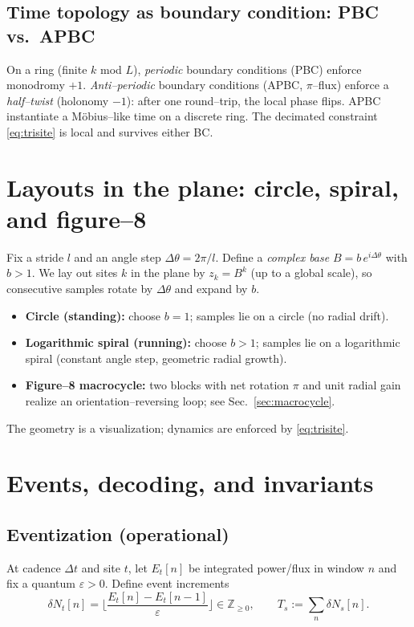 \documentclass[11pt]{article}
\theoremstyle{definition}
\theoremstyle{remark}
\newcommand{\Z}{\mathbb{Z}}
\begin{document}
\subsection{Time topology as boundary condition: PBC vs.\ APBC}
On a ring (finite $k$ mod $L$), \emph{periodic} boundary conditions (PBC) enforce monodromy $+1$.
\emph{Anti--periodic} boundary conditions (APBC, $\pi$--flux) enforce a \emph{half--twist} (holonomy $-1$): after one round--trip,
the local phase flips. APBC instantiate a Möbius--like time on a discrete ring. The decimated constraint \eqref{eq:trisite} is local
and survives either BC.

\section{Layouts in the plane: circle, spiral, and figure--8}
Fix a stride $l$ and an angle step $\Delta\theta=2\pi/l$. Define a \emph{complex base} $B=b\,e^{i\Delta\theta}$ with $b>1$.
We lay out sites $k$ in the plane by $z_k = B^{k}$ (up to a global scale), so consecutive samples rotate by $\Delta\theta$ and expand by $b$.
\begin{itemize}
\item \textbf{Circle (standing):} choose $b=1$; samples lie on a circle (no radial drift).
\item \textbf{Logarithmic spiral (running):} choose $b>1$; samples lie on a logarithmic spiral (constant angle step, geometric radial growth).
\item \textbf{Figure--8 macrocycle:} two blocks with net rotation $\pi$ and unit radial gain realize an orientation--reversing loop;
see Sec.~\ref{sec:macrocycle}.
\end{itemize}
The geometry is a visualization; dynamics are enforced by \eqref{eq:trisite}.

\section{Events, decoding, and invariants}
\subsection{Eventization (operational)}\label{subsec:event}
At cadence $\Delta t$ and site $t$, let $E_t[n]$ be integrated power/flux in window $n$ and fix a quantum $\varepsilon>0$.
Define event increments
\begin{equation}\label{eq:event}
\delta N_t[n]=\Big\lfloor \frac{E_t[n]-E_t[n-1]}{\varepsilon}\Big\rfloor\in\Z_{\ge0},\qquad T_s:=\sum_n \delta N_s[n].
\end{equation}
\end{document}
